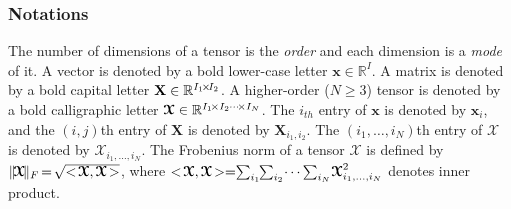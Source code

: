 \documentclass[letterpaper]{article} %
\numberwithin{theorem}{section}
\newcommand{\ten}[1]{ \boldsymbol{\mathcal #1}}
\begin{document}
\subsubsection{Notations}
The number of dimensions of a tensor is the \emph{order} and each dimension is a \emph{mode} of it.  A vector  is denoted by a bold lower-case letter $\mathbf{x} \in \mathbb{R}^I$.
A matrix is denoted by a bold capital letter $\mathbf X \in \mathbb{R}^{I_1 \hspace{-0.05cm}\times\hspace{-0.05cm} I_2 }$.
A higher-order ($N \geq 3$) tensor is denoted by a bold calligraphic letter $\ten{X}\in \mathbb{R}^{I_1\hspace{-0.05cm} \times I_2\hspace{-0.01cm} \cdots \hspace{-0.05cm}\times I_N}$.
The $i_{th}$ entry of  $\mathbf x$ is denoted by $\mathbf x_{i}$, and the $(i,j)$th entry of $\mathbf X$ is denoted by $ \mathbf X_{i_1,i_2}$.
The $(i_1, \ldots, i_N)$th entry of $\ten{X} $ is denoted by $\ten{X}_{i_1, \ldots, i_N}$.
The Frobenius norm of a tensor  $\ten X$ is defined by $\|\hspace{-0.05cm}\ten X\hspace{-0.05cm}\|_F \hspace{-0.05cm}= \hspace{-0.05cm} \sqrt{<\hspace{-0.05cm}\ten X, \ten X\hspace{-0.05cm} >}$, where  $< \hspace{-0.05cm}\ten{X}, \ten{X} \hspace{-0.05cm}> =\hspace{-0.1cm}\sum_{i_1}\hspace{-0.1cm}\sum_{i_2} \hspace{-0.05cm}\cdots\sum_{i_N}\hspace{-0.05cm} \ten{X}_{i_1, \ldots, i_N}^2$ denotes inner product.%
\end{document}
